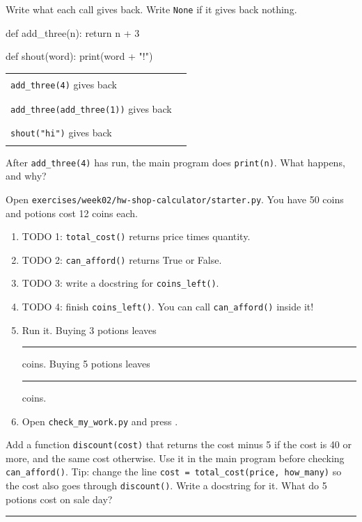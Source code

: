 \namedateline

\begin{core}
Write what each call gives back. Write \texttt{None} if it gives back nothing.
\begin{pycode}
def add_three(n):
    return n + 3

def shout(word):
    print(word + "!")
\end{pycode}
\begin{tabular}{@{}ll@{}}
\texttt{add\_three(4)} gives back & \rule{3cm}{0.4pt} \\[6pt]
\texttt{add\_three(add\_three(1))} gives back & \rule{3cm}{0.4pt} \\[6pt]
\texttt{shout("hi")} gives back & \rule{3cm}{0.4pt} \\
\end{tabular}\par
After \texttt{add\_three(4)} has run, the main program does \texttt{print(n)}. What happens, and why?
\end{core}

\begin{core}
Open \texttt{exercises/week02/hw-shop-calculator/starter.py}. You have 50 coins and potions cost 12 coins each.
\begin{enumerate}[leftmargin=1.4em]
  \item TODO 1: \texttt{total\_cost()} returns price times quantity.
  \item TODO 2: \texttt{can\_afford()} returns True or False.
  \item TODO 3: write a docstring for \texttt{coins\_left()}.
  \item TODO 4: finish \texttt{coins\_left()}. You can call \texttt{can\_afford()} inside it!
  \item Run it. Buying 3 potions leaves \rule{1.5cm}{0.4pt} coins. Buying 5 potions leaves \rule{1.5cm}{0.4pt} coins.
  \item Open \texttt{check\_my\_work.py} and press .
\end{enumerate}
\end{core}

\begin{challenge}
Add a function \texttt{discount(cost)} that returns the cost minus 5 if the cost is 40 or more, and the same cost otherwise.
Use it in the main program before checking \texttt{can\_afford()}. Tip: change the line \texttt{cost = total\_cost(price, how\_many)}
so the cost also goes through \texttt{discount()}. Write a docstring for it.
What do 5 potions cost on sale day? \rule{2cm}{0.4pt}
\end{challenge}

